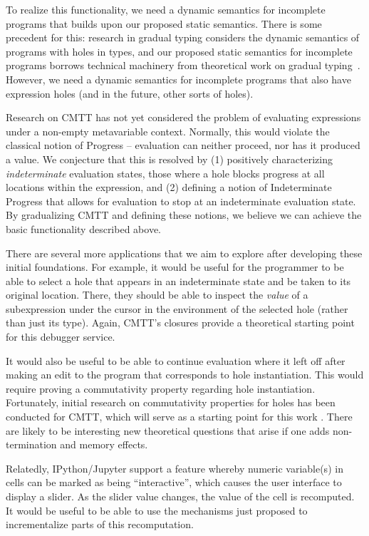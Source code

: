 \documentclass[letterpaper,USenglish]{lipics-v2016}
\begin{document}
To realize this functionality, we need a
{dynamic semantics for incomplete programs} that builds upon our proposed
static semantics. There is some precedent for this: research in gradual typing
considers the dynamic semantics of programs with holes in types, and our
proposed static semantics for incomplete programs borrows technical machinery
from theoretical work on gradual typing~\cite{Siek06a}. However, we need a dynamic semantics for 
 incomplete programs that also have expression holes (and in the future, other sorts of holes). 

Research on CMTT has not yet 
 considered the problem of evaluating expressions under a non-empty metavariable context. 
Normally, this would violate the classical notion of Progress -- 
evaluation can neither proceed, nor has it produced a value. We conjecture that this is
resolved by (1) positively characterizing \emph{indeterminate} 
evaluation states, those where a hole blocks progress at all locations
within the expression, and (2) defining
a notion of Indeterminate Progress that allows for evaluation to stop at an 
indeterminate evaluation state. By gradualizing CMTT and defining these notions, we believe we can achieve the basic functionality described above.

There are several more applications that we aim to explore after developing these initial foundations. For example, it would be useful for the programmer to be able to select a hole that appears in an indeterminate state and be taken to its original location. There, they should be able to inspect the \emph{value} of a subexpression under the cursor in the environment of the selected hole (rather than just its type). Again, CMTT's closures provide a theoretical starting point for this debugger service. 

It would also be useful to be able to continue evaluation where it left off after making an edit to the program that corresponds to hole instantiation. This would require proving a commutativity property regarding hole instantiation. Fortunately, initial research on commutativity properties for holes has been conducted for CMTT, which will serve as a starting point for this work \cite{Nanevski2008}. There are likely to be interesting new theoretical questions that arise if one adds non-termination and memory effects. 

Relatedly, IPython/Jupyter \cite{Perez:2007:ISI:1251563.1251831} support a feature whereby numeric variable(s) in cells can be marked as being ``interactive'', which causes the user interface to display a slider. As the slider value changes, the value of the cell is recomputed. It would be useful to be able to use the mechanisms just proposed to incrementalize parts of this recomputation.
\end{document}
